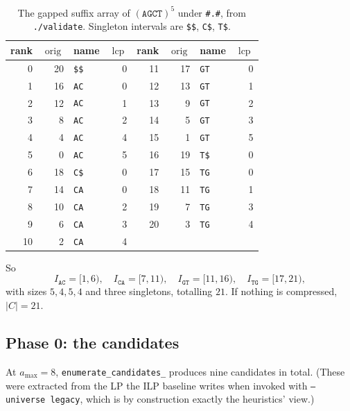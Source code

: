 \documentclass[11pt,a4paper]{article}
\theoremstyle{definition}
\theoremstyle{plain}
\theoremstyle{remark}
\newcommand{\orig}{\operatorname{orig}}
\newcommand{\lcp}{\operatorname{lcp}}
\begin{document}
\begin{table}[h]
\centering
\caption{The gapped suffix array of $(\mathtt{AGCT})^5$ under
  \texttt{\#.\#}, from \texttt{./validate}. Singleton intervals are
  \texttt{\$\$}, \texttt{C\$}, \texttt{T\$}.}
\label{tab:gsa}
\begin{tabular}{rrlr@{\qquad}rrlr}
\toprule
rank & $\orig$ & name & $\lcp$ &
rank & $\orig$ & name & $\lcp$ \\
\midrule
 0 & 20 & \texttt{\$\$} & 0 & 11 & 17 & \texttt{GT} & 0 \\
 1 & 16 & \texttt{AC} & 0 & 12 & 13 & \texttt{GT} & 1 \\
 2 & 12 & \texttt{AC} & 1 & 13 &  9 & \texttt{GT} & 2 \\
 3 &  8 & \texttt{AC} & 2 & 14 &  5 & \texttt{GT} & 3 \\
 4 &  4 & \texttt{AC} & 4 & 15 &  1 & \texttt{GT} & 5 \\
 5 &  0 & \texttt{AC} & 5 & 16 & 19 & \texttt{T\$} & 0 \\
 6 & 18 & \texttt{C\$} & 0 & 17 & 15 & \texttt{TG} & 0 \\
 7 & 14 & \texttt{CA} & 0 & 18 & 11 & \texttt{TG} & 1 \\
 8 & 10 & \texttt{CA} & 2 & 19 &  7 & \texttt{TG} & 3 \\
 9 &  6 & \texttt{CA} & 3 & 20 &  3 & \texttt{TG} & 4 \\
10 &  2 & \texttt{CA} & 4 &    &    &            &   \\
\bottomrule
\end{tabular}
\end{table}

So
\[
  I_{\mathtt{AC}} = [1,6),\quad
  I_{\mathtt{CA}} = [7,11),\quad
  I_{\mathtt{GT}} = [11,16),\quad
  I_{\mathtt{TG}} = [17,21),
\]
with sizes $5, 4, 5, 4$ and three singletons, totalling $21$. If nothing
is compressed, $|C| = 21$.

\subsection{Phase 0: the candidates}
\label{sec:example:cand}

At $a_{\max} = 8$, \texttt{enumerate\_candidates\_} produces nine
candidates in total. (These were extracted from the LP the ILP baseline
writes when invoked with \texttt{--universe legacy}, which is by
construction exactly the heuristics' view.)
\end{document}
